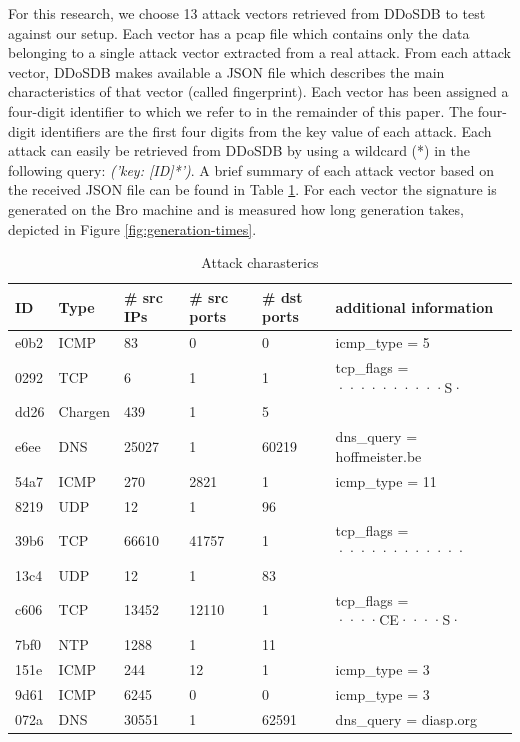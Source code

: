 For this research, we choose 13 attack vectors retrieved from DDoSDB to test against our setup.  Each vector has a pcap file which contains only the data belonging to a single attack vector extracted from a real attack. From each attack vector, DDoSDB makes available a JSON file which describes the main characteristics of that vector (called fingerprint). Each vector has been assigned a four-digit identifier to which we refer to in the remainder of this paper. The four-digit identifiers are the first four digits from the key value of each attack. Each attack can easily be retrieved from DDoSDB by using a wildcard (*) in the following query: \emph{('key: [ID]*')}. A brief summary of each attack vector based on the received JSON file can be found in Table \ref{tab:json-summarry}. For each vector the signature is generated on the Bro machine and is measured how long generation takes, depicted in Figure \ref{fig:generation-times}.   

\begin{table}[H]
\centering
\small
\begin{tabular}{l | l | l | l | l | l}
ID & Type & \# src IPs & \# src ports & \# dst ports & additional information  \\ \hline \hline
e0b2 & ICMP & 83 & 0 & 0 & icmp\_type = 5 \\ \hline
0292 & TCP & 6 & 1 & 1 & tcp\_flags = ··········S· \\ \hline
dd26 & Chargen & 439 & 1 & 5 &  \\ \hline
e6ee & DNS & 25027 & 1 & 60219 & dns\_query = hoffmeister.be \\ \hline
54a7 & ICMP & 270 & 2821 & 1 & icmp\_type = 11 \\ \hline
8219 & UDP & 12 & 1 & 96 &  \\ \hline
39b6 & TCP & 66610 & 41757 & 1 & tcp\_flags = ············ \\ \hline
13c4 & UDP & 12 & 1 & 83 &  \\ \hline
c606 & TCP & 13452 & 12110 & 1 & tcp\_flags = ····CE····S· \\ \hline
7bf0 & NTP & 1288 & 1 & 11 &  \\ \hline
151e & ICMP & 244 & 12 & 1 & icmp\_type = 3 \\ \hline
9d61 & ICMP & 6245 & 0 & 0 & icmp\_type = 3 \\ \hline
072a & DNS & 30551 & 1 & 62591 & dns\_query = diasp.org
\end{tabular}
\caption{\label{tab:json-summarry}Attack charasterics}
\end{table}

